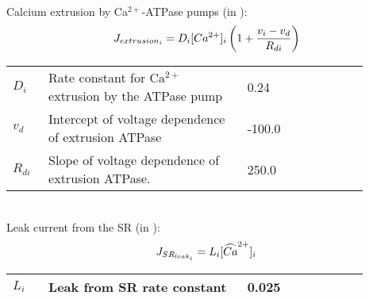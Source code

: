 \\
%
Calcium extrusion by Ca$^{2+}$-ATPase pumps (in \uMs):
\begin{equation} \label{eq:Jextrusioni}
J_{extrusion_{i}} = D_{i}[Ca^{2+}]_{i}   \left( 1+ \frac{v_{i}-v_{d}}{R_{di}}\right)
\end{equation}
%
\begin{table}[h!]
\centering
\begin{tabular}{ p{0.09\linewidth}  >{\footnotesize} p{0.5\linewidth}  >{\footnotesize} p{0.27\linewidth} >{\footnotesize} p{0.03\linewidth} }
\hline
$D_{i}$      			& Rate constant for Ca$^{2+}$ extrusion by the ATPase pump		 & 0.24	\pers			& \cite{Koenigsberger2006} \\
$v_{d}$					& Intercept of voltage dependence of extrusion ATPase			 & -100.0 \mV			& \cite{Koenigsberger2006} \\
$R_{di}$				& Slope of voltage dependence of extrusion ATPase.				 & 250.0 \mV			& \cite{Koenigsberger2006} \\
\hline
\end{tabular}
\label{tab:Jextrusioni}
\end{table}
\\
%
Leak current from the SR (in \uMs):
\begin{equation} \label{eq:JSRleaki}
J_{SR_{leak_{i}}} = L_{i}[\widehat{Ca}^{2+}]_{i}
\end{equation}
\begin{table}[h!]
\centering
\begin{tabular}{ p{0.09\linewidth}  >{\footnotesize} p{0.5\linewidth}  >{\footnotesize} p{0.27\linewidth} >{\footnotesize} p{0.03\linewidth} }
\hline
$L_{i}$      			& Leak from SR rate constant						 & 0.025 \pers				& \cite{Koenigsberger2006} \\
\hline
\end{tabular}
\label{tab:Jleaki}
\end{table}
\\

